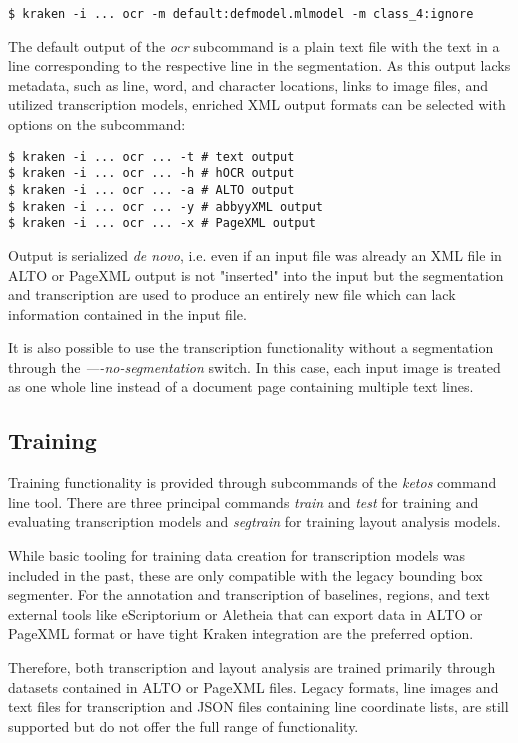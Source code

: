 \begin{verbatim}
$ kraken -i ... ocr -m default:defmodel.mlmodel -m class_4:ignore
\end{verbatim}

The default output of the \emph{ocr} subcommand is a plain text file with the
text in a line corresponding to the respective line in the segmentation. As
this output lacks metadata, such as line, word, and character locations, links
to image files, and utilized transcription models, enriched XML output formats
can be selected with options on the subcommand:

\begin{verbatim}
$ kraken -i ... ocr ... -t # text output
$ kraken -i ... ocr ... -h # hOCR output
$ kraken -i ... ocr ... -a # ALTO output 
$ kraken -i ... ocr ... -y # abbyyXML output
$ kraken -i ... ocr ... -x # PageXML output
\end{verbatim}

Output is serialized \emph{de novo}, i.e. even if an input file was already an
XML file in ALTO or PageXML output is not "inserted" into the input but the
segmentation and transcription are used to produce an entirely new file which
can lack information contained in the input file.

It is also possible to use the transcription functionality without a
segmentation through the \emph{----no-segmentation} switch. In this case, each
input image is treated as one whole line instead of a document page containing
multiple text lines.

\subsection{Training}

Training functionality is provided through subcommands of the \emph{ketos}
command line tool. There are three principal commands \emph{train} and
\emph{test} for training and evaluating transcription models and
\emph{segtrain} for training layout analysis models.

While basic tooling for training data creation for transcription models was
included in the past, these are only compatible with the legacy bounding box
segmenter. For the annotation and transcription of baselines, regions, and
text external tools like eScriptorium or Aletheia that can export data in ALTO
or PageXML format or have tight Kraken integration are the preferred option.

Therefore, both transcription and layout analysis are trained primarily through
datasets contained in ALTO or PageXML files. Legacy formats, line images and
text files for transcription and JSON files containing line coordinate lists,
are still supported but do not offer the full range of functionality.

